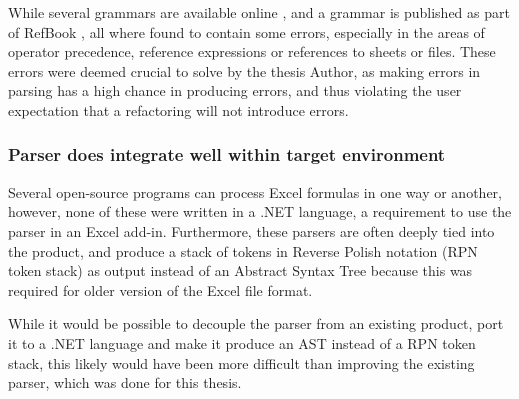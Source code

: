 While several grammars are available online \cite{ewbi,fishbrain}, and a grammar is published as part of RefBook \cite{badame2012refactoring}, all where found to contain some errors, especially in the areas of operator precedence, reference expressions or references to sheets or files.
These errors were deemed crucial to solve by the thesis Author, as making errors in parsing has a high chance in producing errors, and thus violating the user expectation that a refactoring will not introduce errors.

\subsubsection{Parser does integrate well within target environment}

Several open-source programs \cite{libreoffice,calligra} can process Excel formulas in one way or another, however, none of these were written in a .NET language, a requirement to use the parser in an Excel add-in.
Furthermore, these parsers are often deeply tied into the product, and produce a stack of tokens in Reverse Polish notation (RPN token stack) as output instead of an Abstract Syntax Tree because this was required for older version of the Excel file format.

While it would be possible to decouple the parser from an existing product, port it to a .NET language and make it produce an AST instead of a RPN token stack, this likely would have been more difficult than improving the existing parser, which was done for this thesis.